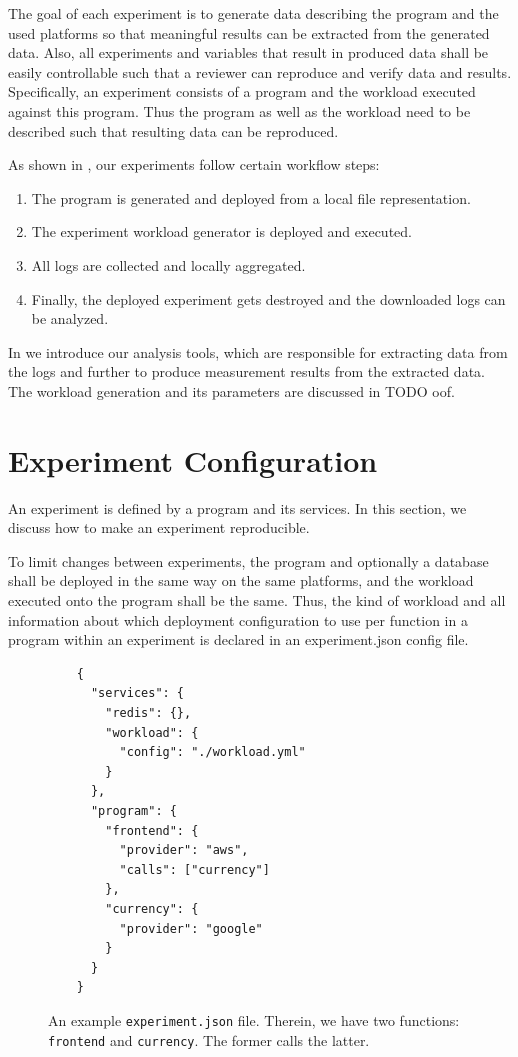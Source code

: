 \documentclass[../main.tex]{subfiles}
\begin{document}
The goal of each experiment is to generate data describing the program and the used platforms 
so that meaningful results can be extracted from the generated data. 
Also, all experiments and variables that result in produced data shall be easily controllable 
such that a reviewer can reproduce and verify data and results.
Specifically, an experiment consists of a program and the workload executed against this program. 
Thus the program as well as the workload need to be described such that resulting data can be reproduced.

As shown in , our experiments follow certain workflow steps: 
\begin{enumerate}
  \item The program is generated and deployed from a local file representation.
  \item The experiment workload generator is deployed and executed.
  \item All logs are collected and locally aggregated.
  \item Finally, the deployed experiment gets destroyed and the downloaded logs can be analyzed.
\end{enumerate}
In  we introduce our analysis tools, which are responsible for 
extracting data from the logs and further to produce measurement results from the extracted data.
The workload generation and its parameters are discussed in TODO oof.

\section{Experiment Configuration}\label{sec:experimentConfig}

An experiment is defined by a program and its services. 
In this section, we discuss how to make an experiment reproducible. 

To limit changes between experiments, the program and optionally a database shall be deployed in the same way on the same platforms, 
and the workload executed onto the program shall be the same. 
Thus, the kind of workload and all information about which deployment configuration
to use per function in a program within an experiment is declared in an experiment.json config file.

\begin{figure}
  \begin{tcolorbox}
    \begin{verbatim}
    {
      "services": {
        "redis": {},
        "workload": {
          "config": "./workload.yml"
        }
      },
      "program": {
        "frontend": {
          "provider": "aws",
          "calls": ["currency"]
        },
        "currency": {
          "provider": "google"
        }
      }
    }
    \end{verbatim}
  \end{tcolorbox}
\caption[experiment.json Config Example]{An example \texttt{experiment.json} file. 
Therein, we have two functions: \texttt{frontend} and \texttt{currency}. The former calls the latter.}%
\label{fig:exampleExperimentConfig}
\end{figure}
\end{document}
